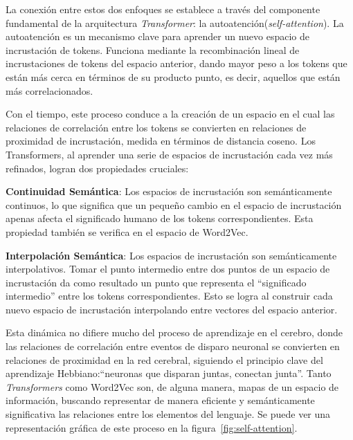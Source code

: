La conexión entre estos dos enfoques se establece a través del componente fundamental de la arquitectura \textit{Transformer}: la autoatención(\textit{self-attention}). La autoatención es un mecanismo clave para aprender un nuevo espacio de incrustación de tokens. Funciona mediante la recombinación lineal de incrustaciones de tokens del espacio anterior, dando mayor peso a los tokens que están más cerca en términos de su producto punto, es decir, aquellos que están más correlacionados.

Con el tiempo, este proceso conduce a la creación de un espacio en el cual las relaciones de correlación entre los tokens se convierten en relaciones de proximidad de incrustación, medida en términos de distancia coseno. Los Transformers, al aprender una serie de espacios de incrustación cada vez más refinados, logran dos propiedades cruciales:

\begin{description}

\item \textbf{Continuidad Semántica}: Los espacios de incrustación son semánticamente continuos, lo que significa que un pequeño cambio en el espacio de incrustación apenas afecta el significado humano de los tokens correspondientes. Esta propiedad también se verifica en el espacio de Word2Vec.

\item \textbf{Interpolación Semántica}: Los espacios de incrustación son semánticamente interpolativos. Tomar el punto intermedio entre dos puntos de un espacio de incrustación da como resultado un punto que representa el ``significado intermedio'' entre los tokens correspondientes. Esto se logra al construir cada nuevo espacio de incrustación interpolando entre vectores del espacio anterior.

\end{description}

Esta dinámica no difiere mucho del proceso de aprendizaje en el cerebro, donde las relaciones de correlación entre eventos de disparo neuronal se convierten en relaciones de proximidad en la red cerebral, siguiendo el principio clave del aprendizaje Hebbiano:``neuronas que disparan juntas, conectan junta''. Tanto \textit{Transformers} como Word2Vec son, de alguna manera, mapas de un espacio de información, buscando representar de manera eficiente y semánticamente significativa las relaciones entre los elementos del lenguaje. Se puede ver una representación gráfica de este proceso en la figura~\ref{fig:self-attention}.

